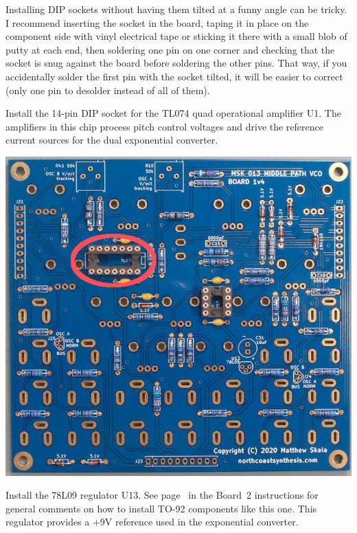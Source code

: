 Installing DIP sockets without having them tilted at a funny angle can be
tricky.  I recommend inserting the socket in the board, taping it in place
on the component side with vinyl electrical tape or sticking it there with a
small blob of putty at each end, then soldering one pin on
one corner and checking that the socket is snug against the board before
soldering the other pins.  That way, if you accidentally solder the first
pin with the socket tilted, it will be easier to correct (only one pin to
desolder instead of all of them).

\pagebreak

Install the 14-pin DIP socket for the TL074 quad operational amplifier U1. 
The amplifiers in this chip process pitch control voltages and drive the
reference current sources for the dual exponential converter.

\nopagebreak
\noindent\includegraphics[width=\linewidth]{dip14-1.jpg}

Install the 78L09 regulator U13.  See page~\pageref{pag:to-92} in the
Board~2 instructions for general comments on how to install TO-92 components
like this one.  This regulator provides a +9V reference used in the
exponential converter.

